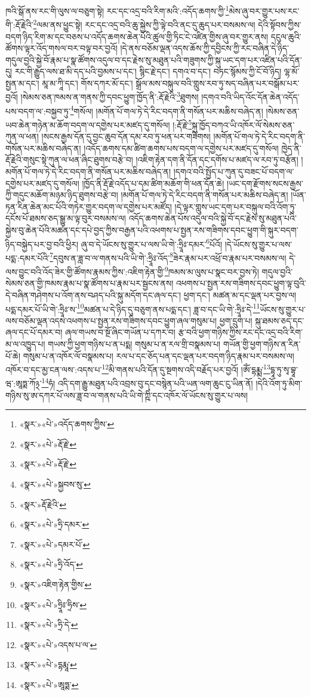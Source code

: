ཁའི་སྒོ་ནས་རང་གི་ལུས་ལ་བཅུག་སྟེ། རང་དང་འདྲ་བའི་རིག་མའི་:འདོད་ཆགས་ཀྱི་\footnote{«སྣར་»«པེ་»འདོད་ཆགས་ཀྱིས་}མེས་ཞུ་བར་གྱུར་པས་རང་གི་:རྡོ་རྗེའི་\footnote{«སྣར་»«པེ་»རྡོ་རྗེ་}ལམ་ནས་ཕྱུང་སྟེ། རང་དང་འདྲ་བའི་ཆུ་སྐྱེས་ཀྱི་ལྟེ་བའི་ནང་དུ་ཆུད་པར་བསམས་ལ། དེའི་སྟོབས་ཀྱིས་བདག་ཉིད་རིག་མ་དང་བཅས་པ་འདོད་ཆགས་ཆེན་པོའི་ཚུལ་གྱི་ཏིང་ངེ་འཛིན་གྱིས་ཞུ་བར་གྱུར་ནས། དངུལ་ཆུའི་ཚོགས་ལྟར་འོད་གསལ་བར་བལྟ་བར་བྱའོ། །དེ་ནས་བཅོམ་ལྡན་འདས་ཆོས་ཀྱི་དབྱིངས་ཀྱི་རང་བཞིན་དེ་ཉིད་གདུལ་བྱའི་སྐྱེ་བོ་རྣམ་པ་སྣ་ཚོགས་འདུལ་བ་དང་རྗེས་སུ་མཐུན་པའི་གཟུགས་ཀྱི་སྐུ་ཡང་དག་པར་འཛིན་པའི་དོན་དུ། རང་གི་རྒྱུད་ལས་ཐ་མི་དད་པའི་བྱམས་པ་དང་། སྙིང་རྗེ་དང་། དགའ་བ་དང་། བཏང་སྙོམས་ཀྱི་ངོ་བོ་ཉིད། ལྷ་མོ་སྤྱན་མ་དང་། མཱ་མ་ཀཱི་དང་། གོས་དཀར་མོ་དང་། སྒྲོལ་མས་བསྐུལ་བའི་གླུས་རབ་ཏུ་སད་བཞིན་པར་བསྒོམ་པར་བྱའོ། །སེམས་ཅན་ཁམས་ན་གནས་ཀྱི་དབང་ཕྱུག་ཁྱོད་ནི་:རྡོ་རྗེའི་\footnote{«སྣར་»«པེ་»རྡོ་རྗེ་}ཐུགས། །དགའ་བའི་ཡིད་འོང་དོན་ཆེན་འདོད་པས་བདག་ལ་:བསྐྱབ་ཏུ་\footnote{«སྣར་»«པེ་»སྐྱབས་སུ་}གསོལ། །མགོན་པོ་གལ་ཏེ་དེ་རིང་བདག་ནི་གསོན་པར་མཆིས་བཞེད་ན། །སེམས་ཅན་ཡབ་ཆེན་གཉེན་མ་ཆོག་བདག་ལ་དགྱེས་པར་མཛད་དུ་གསོལ། །:རྡོ་རྗེ་\footnote{«སྣར་»རྡོ་རྗེའི་}སྐུ་ཁྱོད་བཀའ་ཡི་འཁོར་ལོ་སེམས་ཅན་ཀུན་ལ་ཕན། །སངས་རྒྱས་དོན་དུ་བྱང་ཆུབ་དོན་དམ་རབ་ཏུ་ཕན་པར་གཟིགས། །མགོན་པོ་གལ་ཏེ་དེ་རིང་བདག་ནི་གསོན་པར་མཆིས་བཞེད་ན། །འདོད་ཆགས་དམ་ཚིག་ཆགས་པས་བདག་ལ་དགྱེས་པར་མཛད་དུ་གསོལ། ཁྱེད་ནི་རྡོ་རྗེའི་གསུང་སྟེ་ཀུན་ལ་ཕན་ཞིང་ཐུགས་བརྩེ་བ། །འཇིག་རྟེན་དག་ནི་དོན་དང་དགོས་པ་མཛད་ལ་རབ་ཏུ་བརྩོན། །མགོན་པོ་གལ་ཏེ་དེ་རིང་བདག་ནི་གསོན་པར་མཆིས་བཞེད་ན། །དགའ་བའི་སྤྱོད་པ་ཀུན་དུ་བཟང་པོ་བདག་ལ་དགྱེས་པར་མཛད་དུ་གསོལ། །ཁྱོད་ནི་རྡོ་རྗེ་འདོད་པ་དམ་ཚིག་མཆོག་གི་ཕན་དོན་ཆེ། །ཡང་དག་རྫོགས་སངས་རྒྱས་ཀྱི་གདུང་མཆོག་མཉམ་ཉིད་ཐུགས་བརྩེ་བ། །མགོན་པོ་གལ་ཏེ་དེ་རིང་བདག་ནི་གསོན་པར་མཆིས་བཞེད་ན། །ཡོན་ཏན་རིན་ཆེན་མང་པོའི་གཏེར་གྱུར་བདག་ལ་དགྱེས་པར་མཛོད། །དེ་ལྟར་གླུས་ཡང་དག་པར་བསྐུལ་བའི་འོག་ཏུ་དངོས་པོ་ཐམས་ཅད་སྒྱུ་མ་ལྟ་བུར་བསམས་ལ། འདོད་ཆགས་ཆེན་པོས་འདུལ་བའི་སྐྱེ་བོ་དང་རྗེས་སུ་མཐུན་པའི་སྐྱེས་བུ་ཆེན་པོའི་མཚན་དང་དཔེ་བྱད་ཀྱིས་བརྒྱན་པའི་འཕགས་པ་སྤྱན་རས་གཟིགས་དབང་ཕྱུག་གི་སྐུར་བདག་ཉིད་བསྐྱེད་པར་བྱ་བའི་ཕྱིར། ཞུ་བ་དེ་ཡོངས་སུ་གྱུར་པ་ལས་ཡི་གེ་:ཧྲཱིཿ་དམར་\footnote{«སྣར་»«པེ་»ཧྲི་དམར་}པོའོ། །དེ་ཡོངས་སུ་གྱུར་པ་ལས་པདྨ་:དམར་པོའི་\footnote{«སྣར་»«པེ་»དམར་པོ་}དབུས་ན་ཟླ་བ་ལ་གནས་པའི་ཡི་གེ་:ཧྲཱིཿ་འོད་\footnote{«སྣར་»«པེ་»ཧྲི་འོད་}ཟེར་རྣམ་པར་འཕྲོ་བ་རྣམ་པར་བསམས་ལ། དེ་ལས་བྱུང་བའི་འོད་ཟེར་གྱི་ཚོགས་རྣམས་ཀྱིས་:འཇིག་རྟེན་གྱི་\footnote{«སྣར་»འཇིག་རྟེན་གྱིས་}ཁམས་མ་ལུས་པ་སྣང་བར་བྱས་ཏེ། གདུལ་བྱའི་སེམས་ཅན་གྱི་ཁམས་རྣམ་པ་སྣ་ཚོགས་པ་རྣམ་པར་སྦྱངས་ནས། འཕགས་པ་སྤྱན་རས་གཟིགས་དབང་ཕྱུག་ལྟ་བུའི་དེ་བཞིན་གཤེགས་པ་འོག་ནས་བཤད་པའི་སྐུ་མདོག་དང་ཞལ་དང་། ཕྱག་དང་། མཚན་མ་དང་ལྡན་པར་བྱས་ལ། པདྨ་དམར་པོ་ཡི་གེ་:ཧྲཱིཿ་ས་\footnote{«སྣར་»«པེ་»ཧྲཱིཿ་ཧྲིས་}མཚན་པ་དེ་ཉིད་དུ་བཅུག་ནས་པདྨ་དང་། ཟླ་བ་དང་ཡི་གེ་:ཧྲཱིཿ་དེ་\footnote{«སྣར་»«པེ་»ཧྲི་དེ་}ཡོངས་སུ་གྱུར་པ་ལས་བཅོམ་ལྡན་འདས་འཕགས་པ་སྤྱན་རས་གཟིགས་དབང་ཕྱུག་ཞལ་གསུམ་པ། ཕྱག་དྲུག་པ། སྐུ་ཐམས་ཅད་དང་ཞལ་དང་པོ་དམར་བ། ཞལ་གཡས་བ་སྔོ་ཞིང་གཡོན་པ་དཀར་བ། རྩ་བའི་ཕྱག་གཉིས་ཀྱིས་རང་དང་འདྲ་བའི་རིག་མ་ལ་འཁྱུད་པ། གཡས་ཀྱི་ཕྱག་གཉིས་པ་ན་པདྨ། གསུམ་པ་ན་རལ་གྲི་བསྣམས་པ། གཡོན་གྱི་ཕྱག་གཉིས་ན་རིན་པོ་ཆེ། གསུམ་པ་ན་འཁོར་ལོ་བསྣམས་པ། རལ་པ་དང་ཅོད་པན་དང་ལྡན་པར་བདག་ཉིད་རྣམ་པར་བསམས་ལ། འཁོར་བ་དང་མྱ་ངན་ལས་:འདས་པ་\footnote{«སྣར་»«པེ་»འདས་པ་ལ་}མི་གནས་པའི་དོན་དུ་སྔགས་འདི་བརྗོད་པར་བྱའོ། །ཨོཾ་དྷརྨྨ་\footnote{«སྣར་»«པེ་»དྷརྨཱ་}དྷཱ་ཏུ་སྭ་བྷཱ་ཝ་:ཨཱཏྨ་ཀོ྅་\footnote{«སྣར་»«པེ་»ཨཱཏྨ་}ཧཾ། འདི་དག་རྒྱུ་མཐུན་པའི་འབྲས་བུ་དང་བསྙེན་པའི་ཡན་ལག་ཆུང་ངུ་ཡིན་ནོ། །དེའི་འོག་ཏུ་མིག་གཉིས་སུ་ཨ་དཀར་པོ་ལས་ཟླ་བ་ལ་གནས་པའི་ཡི་གེ་ཀྵིཾ་དང་འཁོར་ལོ་ཡོངས་སུ་གྱུར་པ་ལས། 